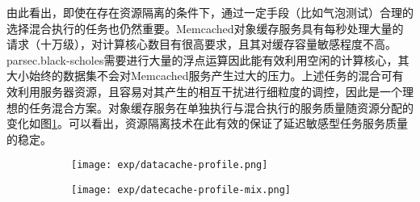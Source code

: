 由此看出，即使在存在资源隔离的条件下，通过一定手段（比如气泡测试\cite{mars2011bubble}）合理的选择混合执行的任务也仍然重要。Memcached对象缓存服务具有每秒处理大量的请求（十万级），对计算核心数目有很高要求，且其对缓存容量敏感程度不高。parsec.black-scholes需要进行大量的浮点运算因此能有效利用空闲的计算核心，其大小始终的数据集不会对Memcached服务产生过大的压力。上述任务的混合可有效利用服务器资源，且容易对其产生的相互干扰进行细粒度的调控，因此是一个理想的任务混合方案。对象缓存服务在单独执行与混合执行的服务质量随资源分配的变化如图\ref{fig:data-cache-res}。可以看出，资源隔离技术在此有效的保证了延迟敏感型任务服务质量的稳定。
  \vspace{1em}
\begin{figure}
  \centering
  \begin{subfigure}{0.45\textwidth}
    \centering
    \texttt{[image: exp/datacache-profile.png]}
  \end{subfigure}
  \hspace{1em}
  \begin{subfigure}{0.45\textwidth}
    \centering
    \texttt{[image: exp/datecache-profile-mix.png]}
  \end{subfigure}
  \label{fig:data-cache-res}
\end{figure}


